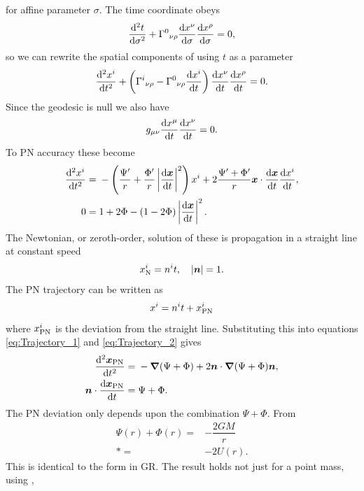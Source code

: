 for affine parameter $\sigma$. The time coordinate obeys
\begin{equation}
\dfrac{\mathrm{d}^2 {t}}{\mathrm{d} {\sigma}^2} + {\Gamma^0}_{\nu\rho}\dfrac{\mathrm{d} {x^\nu}}{\mathrm{d} {\sigma}}\dfrac{\mathrm{d} {x^\rho}}{\mathrm{d} {\sigma}} = 0,
\end{equation}
so we can rewrite the spatial components of  using $t$ as a parameter \citep[section 6.1]{Will1993}
\begin{equation}
\dfrac{\mathrm{d}^2 {x^i}}{\mathrm{d} {t}^2} + \left({\Gamma^i}_{\nu\rho} - {\Gamma^0}_{\nu\rho}\dfrac{\mathrm{d} {x^i}}{\mathrm{d} {t}}\right)\dfrac{\mathrm{d} {x^\nu}}{\mathrm{d} {t}}\dfrac{\mathrm{d} {x^\rho}}{\mathrm{d} {t}} = 0.
\end{equation}
Since the geodesic is null we also have
\begin{equation}
g_{\mu\nu}\dfrac{\mathrm{d} {x^\mu}}{\mathrm{d} {t}}\dfrac{\mathrm{d} {x^\nu}}{\mathrm{d} {t}} = 0.
\end{equation}
To PN accuracy these become
\begin{align}
\label{eq:Trajectory_1}
\dfrac{\mathrm{d}^2 {x^i}}{\mathrm{d} {t}^2} = {} & -\left(\dfrac{\Psi'}{r} + \dfrac{\Phi'}{r}\left|\dfrac{\mathrm{d} {\boldsymbol{x}}}{\mathrm{d} {t}}\right|^2\right)x^i + 2\dfrac{\Psi' + \Phi'}{r}\boldsymbol{x}\cdot\dfrac{\mathrm{d} {\boldsymbol{x}}}{\mathrm{d} {t}}\dfrac{\mathrm{d} {x^i}}{\mathrm{d} {t}}, \\
0 = {} & 1 + 2\Phi - \left(1 - 2\Phi\right)\left|\dfrac{\mathrm{d} {\boldsymbol{x}}}{\mathrm{d} {t}}\right|^2.
\label{eq:Trajectory_2}
\end{align}
The Newtonian, or zeroth-order, solution of these is propagation in a straight line at constant speed \citep[section 6.1]{Will1993}
\begin{equation}
x^i_\mathrm{N} = n^it, \quad |\boldsymbol{n}| = 1.
\end{equation}
The PN trajectory can be written as
\begin{equation}
x^i = n^it + x^i_\mathrm{PN}
\end{equation}
where $x^i_\mathrm{PN}$ is the deviation from the straight line. Substituting this into equations \eqref{eq:Trajectory_1} and \eqref{eq:Trajectory_2} gives
\begin{align}
\dfrac{\mathrm{d}^2 {\boldsymbol{x}_\mathrm{PN}}}{\mathrm{d} {t}^2} = {} & -\boldsymbol{\nabla}(\Psi + \Phi) + 2\boldsymbol{n}\cdot\boldsymbol{\nabla}(\Psi + \Phi)\boldsymbol{n}, \\
\boldsymbol{n}\cdot\dfrac{\mathrm{d} {\boldsymbol{x}_\mathrm{PN}}}{\mathrm{d} {t}} = {} & \Psi + \Phi.
\end{align}
The PN deviation only depends upon the combination $\Psi + \Phi$. From 
\begin{align}
\Psi(r) + \Phi(r) = {} & -\dfrac{2GM}{r} \nonumber \\*
 = {} & -2U(r).
\end{align}
This is identical to the form in GR. The result holds not just for a point mass, using ,
